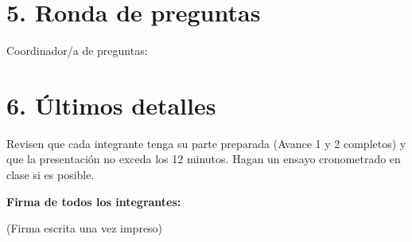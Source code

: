\documentclass[11pt,letterpaper]{article}
\newcommand{\texto}[2][]{\TextField[#1]{#2}}
\begin{document}
\section*{5. Ronda de preguntas}
Coordinador/a de preguntas: \texto[name=coordinador,width=8cm]{}

\section*{6. Últimos detalles}
Revisen que cada integrante tenga su parte preparada (Avance 1 y 2 completos) y que la presentación no exceda los 12 minutos. Hagan un ensayo cronometrado en clase si es posible.

\vspace{0.5cm}
\textbf{Firma de todos los integrantes:}

\vspace{0.3cm}
\texto[name=firma1,width=6cm]{}\hspace{2cm}\texto[name=firma2,width=6cm]{}

\vspace{0.3cm}
\texto[name=firma3,width=6cm]{}\hspace{2cm}\texto[name=firma4,width=6cm]{}


(Firma escrita una vez impreso)
\end{document}
